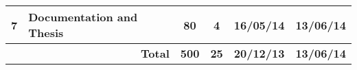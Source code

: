 \begin{longtable}{|l|p{7cm}|c|c|c|c|}
    7 & \textbf{Documentation and Thesis} & 80 & 4 & 16/05/14 & 13/06/14 \\ \hline
     \multicolumn{2}{|r|}{\textbf{Total}} & \textbf{500} & \textbf{25} & \textbf{20/12/13} & \textbf{13/06/14} \\ \hline
    
\end{longtable}

\newpage

